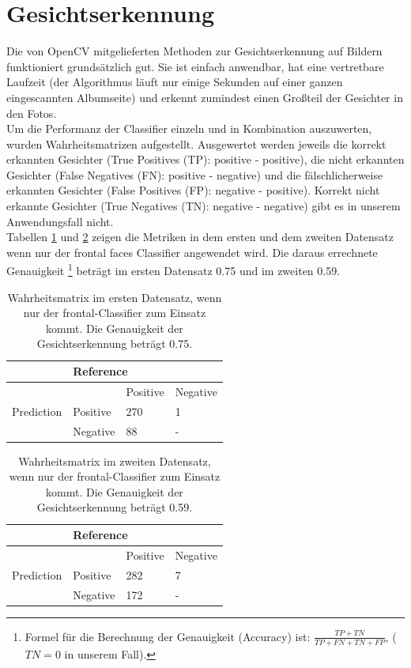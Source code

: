 \section{Gesichtserkennung}
Die von OpenCV mitgelieferten Methoden zur Gesichtserkennung auf Bildern funktioniert grundsätzlich gut. Sie ist einfach anwendbar, hat eine vertretbare Laufzeit (der Algorithmus läuft nur einige Sekunden auf einer ganzen eingescannten Albumseite) und erkennt zumindest einen Großteil der Gesichter in den Fotos. \\
Um die Performanz der Classifier einzeln und in Kombination auszuwerten, wurden Wahrheitsmatrizen aufgestellt. Ausgewertet werden jeweils die korrekt erkannten Gesichter (True Positives (TP): positive - positive), die nicht erkannten Gesichter (False Negatives (FN): positive - negative) und die fälschlicherweise erkannten Gesichter (False Positives (FP): negative - positive). Korrekt nicht erkannte Gesichter (True Negatives (TN): negative - negative) gibt es in unserem Anwendungsfall nicht.\\
Tabellen \ref{tab:set1frontal} und \ref{tab:set2frontal} zeigen die Metriken in dem ersten und dem zweiten Datensatz wenn nur der frontal faces Classifier angewendet wird. Die daraus errechnete Genauigkeit \footnote{Formel für die Berechnung der Genauigkeit (\grqq Accuracy\grqq) ist: $\frac{TP + TN}{TP + FN + TN + FP}$, ($TN = 0$ in unserem Fall).} beträgt im ersten Datensatz 0.75 und im zweiten 0.59.\\
\begin{table}[h]
	\centering
	\begin{tabular}{l|lll}
		\hline
		& \multicolumn{3}{l}{Reference} \\ \hline
		\multirow{3}{*}{Prediction} &  & Positive & Negative \\
		& Positive & 270 & 1 \\
		& Negative & 88 & - \\ \hline 
	\end{tabular}
	\caption{Wahrheitsmatrix im ersten Datensatz, wenn nur der frontal-Classifier zum Einsatz kommt. Die Genauigkeit der Gesichtserkennung beträgt 0.75.}
	\label{tab:set1frontal}
\end{table}
\begin{table}[h]
	\centering
	\begin{tabular}{llll}
		\hline
		& \multicolumn{3}{l}{Reference} \\ \hline
		\multirow{3}{*}{Prediction} &  & Positive & Negative \\
		& Positive & 282 & 7 \\
		& Negative & 172 & - \\ \cline{2-4} 
	\end{tabular}
	\caption{Wahrheitsmatrix im zweiten Datensatz, wenn nur der frontal-Classifier zum Einsatz kommt. Die Genauigkeit der Gesichtserkennung beträgt 0.59.}
	\label{tab:set2frontal}
\end{table}
